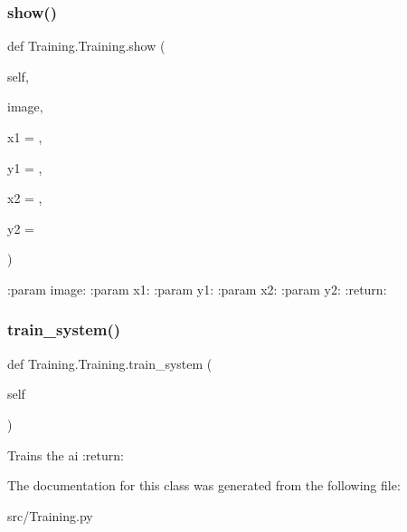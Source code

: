 \subsubsection{\texorpdfstring{show()}{show()}}
{\footnotesize\ttfamily def Training.\+Training.\+show (\begin{DoxyParamCaption}\item[{}]{self,  }\item[{}]{image,  }\item[{}]{x1 = {},  }\item[{}]{y1 = {},  }\item[{}]{x2 = {},  }\item[{}]{y2 = {} }\end{DoxyParamCaption})}

\begin{DoxyVerb}:param image:
:param x1:
:param y1:
:param x2:
:param y2:
:return:
\end{DoxyVerb}
 \mbox{\label{class_training_1_1_training_ae08acd1661b3b8d7b7b12a9648abe876}} 
\subsubsection{\texorpdfstring{train\+\_\+system()}{train\_system()}}
{\footnotesize\ttfamily def Training.\+Training.\+train\+\_\+system (\begin{DoxyParamCaption}\item[{}]{self }\end{DoxyParamCaption})}

\begin{DoxyVerb}Trains the ai
:return:
\end{DoxyVerb}
 

The documentation for this class was generated from the following file\+:\begin{DoxyCompactItemize}
\item 
src/Training.\+py\end{DoxyCompactItemize}
